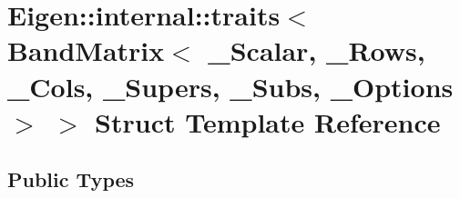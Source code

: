 \hypertarget{struct_eigen_1_1internal_1_1traits_3_01_band_matrix_3_01___scalar_00_01___rows_00_01___cols_00_03762db5085b3b9896d5a124beda4837b}{}\section{Eigen\+::internal\+::traits$<$ Band\+Matrix$<$ \+\_\+\+Scalar, \+\_\+\+Rows, \+\_\+\+Cols, \+\_\+\+Supers, \+\_\+\+Subs, \+\_\+\+Options $>$ $>$ Struct Template Reference}
\label{struct_eigen_1_1internal_1_1traits_3_01_band_matrix_3_01___scalar_00_01___rows_00_01___cols_00_03762db5085b3b9896d5a124beda4837b}
\subsection*{Public Types}
